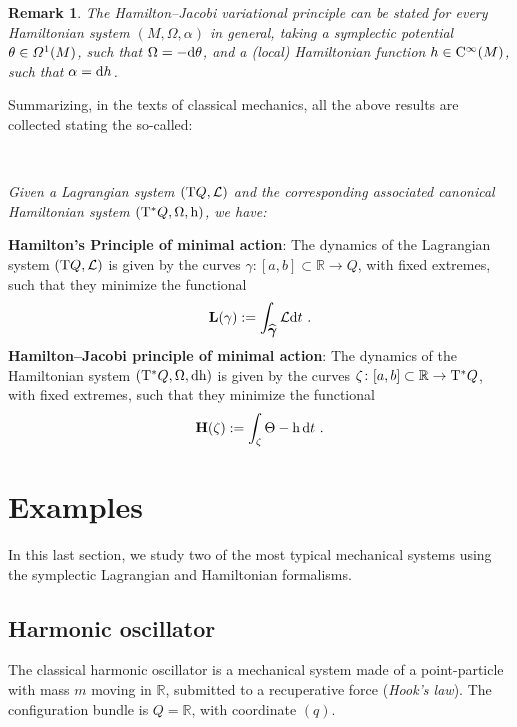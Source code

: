 \documentclass[12pt]{report}
\newtheorem{remark}[teor]{Remark}
\def\df{{\mit\Omega}}
\def\Lag{{\cal L}}
\def\d{{\rm d}}
\def\Real{\mathbb{R}}
\def\Tan{{\rm T}}
\def\Cinfty{{\rm C}^\infty}
\begin{document}
\begin{remark}{\rm 
The Hamilton--Jacobi variational principle can be stated for every
Hamiltonian system $(M,\Omega,\alpha)$ in general, taking a symplectic potential
$\theta\in\df^1(M)$, such that $\Omega=-\d\theta$,
and a (local) Hamiltonian function $h\in\Cinfty(M)$,
such that $\alpha=\d h$.
}\end{remark}

\vspace{0.2cm}

Summarizing, 
in the texts of classical mechanics, all the above results are collected
stating the so-called:

 \
{\it
Given a Lagrangian system $(\Tan Q,\Lag )$ and the corresponding associated canonical 
Hamiltonian system $(\Tan^*Q,\Omega,{\rm h})$, we have:

\noindent\textbf{Hamilton's Principle of minimal action}:
The dynamics of the Lagrangian system
$(\Tan Q,\Lag)$ is given by  the curves
$\gamma \colon [a,b]\subset\Real \to Q$,
with fixed extremes, such that they minimize the functional
$$
{\mathbf L}(\gamma ):=\int_{\widehat{\mbox{\boldmath$\gamma$}}} \Lag\d t \ .
$$
\textbf{Hamilton--Jacobi principle of minimal action}:
The dynamics of the Hamiltonian system
$(\Tan^*Q,\Omega,\d{\rm h})$ is given by the curves
$\zeta \colon [a,b]\subset\Real \to \Tan^*Q$,
with fixed extremes, such that they minimize the functional
$$
{\mathbf H}(\zeta ):=\int_\zeta \Theta -{\rm h}\,\d t \ .
$$
}


\section{Examples}


In this last section, we study two of the most typical mechanical systems
using the symplectic Lagrangian and Hamiltonian formalisms.


\subsection{Harmonic oscillator}
\label{sho}


The classical harmonic oscillator is a mechanical system 
made of a point-particle with mass $m$
moving in $\Real$, submitted to a recuperative force ({\sl Hook's law\/}).
The configuration bundle is $Q=\Real$, with coordinate $(q)$.
\end{document}
